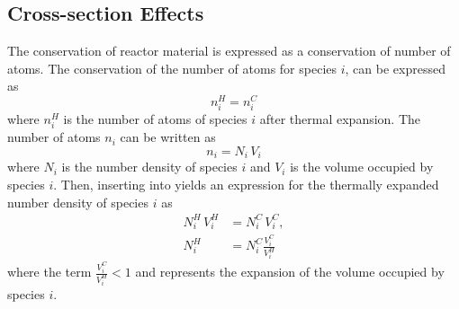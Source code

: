   \subsection{Cross-section Effects}
    \label{sec:cross-section_effects}
    The conservation of reactor material is expressed as a conservation of 
    number of atoms. The conservation of the number of atoms for species $i$, 
    can be expressed as
    \begin{equation}
      \label{eq:conservation}
      n_i^H = n_i^C 
    \end{equation}
    where $n_i^H$ is the number of atoms of species $i$ after thermal expansion.
    The number of atoms $n_i$ can be written as 
    \begin{equation}
      \label{eq:nden_definition}
      n_i = N_i \, V_i
    \end{equation}
    where $N_i$ is the number density of species $i$ and $V_i$ is the volume
    occupied by species $i$. Then, inserting  into 
     yields an expression for the thermally expanded 
    number density of species $i$ as
    \begin{align}
      N_i^H \, V_i^H &= N_i^C \, V_i^C, \\
      \label{eq:nden_volume_ratio}
      N_i^H &= N_i^C \frac{V_i^C}{V_i^H}
    \end{align}
    where the term $\frac{V_i^C}{V_i^H} < 1$ and represents the expansion of the
    volume occupied by species $i$. 

